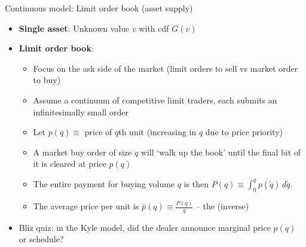 \documentclass[english,10pt
,aspectratio=169
]{beamer}
\begin{document}
\begin{frame}{Continuous model: Limit order book (asset supply)}
\begin{itemize}
	\item \textbf{Single asset}: Unknown value $v$ with cdf $G(v)$
	\item \textbf{Limit order book}: 
	\begin{itemize}
		\item Focus on the ask side of the market (limit orders to sell vs market order to buy)
		\item Assume a continuum of competitive limit traders, each submits an infinitesimally small order
		\item Let $p(q) \equiv$ price of $q$th unit (increasing in $q$ due to price priority)
		\item A market buy order of size $q$ will `walk up the book' until the final bit of it is cleared at price $p(q)$
		\item The entire payment for buying volume $q$ is then $P(q) \equiv \int_0^q p(\tilde{q}) \, d\tilde{q}$.
		\item The average price per unit is $\bar{p}(q) \equiv \frac{P(q)}{q}$  -- the (inverse) 
	\end{itemize}
	\pause
	\item Bliz quiz: in the Kyle model, did the dealer announce \alert{marginal price $p(q)$} or  schedule?
\end{itemize}
\end{frame}
\end{document}
